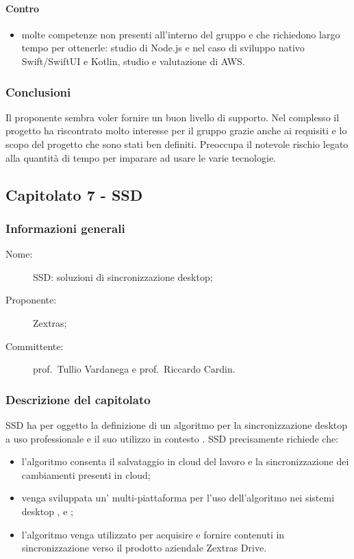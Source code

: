 \paragraph*{Contro}
\begin{itemize}
	\item molte competenze non presenti all'interno del gruppo e che richiedono largo tempo per ottenerle: studio di Node.js e nel caso di sviluppo nativo Swift/SwiftUI e Kotlin, studio e valutazione di AWS.
\end{itemize}
\subsubsection{Conclusioni}
Il proponente sembra voler fornire un buon livello di supporto. Nel complesso il progetto ha riscontrato molto interesse per il gruppo grazie anche ai requisiti e lo scopo del progetto che sono stati ben definiti. Preoccupa il notevole rischio legato alla quantità di tempo per imparare ad usare le varie tecnologie.

\subsection{Capitolato 7 - SSD}
\subsubsection{Informazioni generali}
\begin{description}
	\item[Nome:] SSD: soluzioni di sincronizzazione desktop;
	\item[Proponente:] Zextras;
	\item[Committente:] prof.~Tullio Vardanega e prof.~Riccardo Cardin.
\end{description}
\subsubsection{Descrizione del capitolato}
SSD ha per oggetto la definizione di un algoritmo per la sincronizzazione desktop a uso professionale e il suo utilizzo in contesto . SSD precisamente richiede che:
\begin{itemize}
	\item l'algoritmo consenta il salvataggio in cloud del lavoro e la sincronizzazione dei cambiamenti presenti in cloud;
	\item venga sviluppata un' multi-piattaforma per l'uso dell'algoritmo nei sistemi desktop ,  e ;
	\item l'algoritmo venga utilizzato per acquisire e fornire contenuti in sincronizzazione verso il prodotto aziendale Zextras Drive.
\end{itemize}
